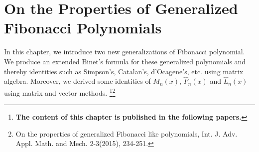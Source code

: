 

\let\textcircled=\pgftextcircled
\chapter{On the Properties of Generalized Fibonacci Polynomials}
\label{chap:On the Properties of Generalized Fibonacci  Polynomials}
In this chapter, we introduce two new generalizations of Fibonacci polynomial. We produce an extended Binet's formula for these generalized polynomials and thereby identities such as Simpson's, Catalan's, d'Ocagene's, etc. using matrix algebra. Moreover, we derived some identities of $M_{n}(x)$, $\widehat{F}_{n}(x)$ and $\widehat{L}_{n}(x)$ using matrix and vector methods. 
\vspace{2mm}
\let\thefootnote\relax\footnote{\textbf{\hspace{-0.78cm}The content of this chapter is published in the following papers.}}\footnote{\hspace{-0.78cm}On the properties of generalized Fibonacci like polynomials, Int. J. Adv. Appl. Math. and Mech. 2-3(2015), 234-251.}
